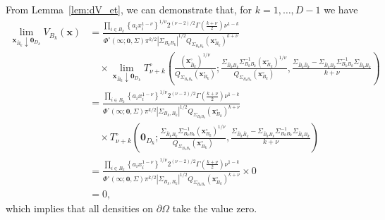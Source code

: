 \documentclass[lineno]{biometrika}
\begin{document}
From Lemma~\ref{lem:dV_et}, we can demonstrate that, for $k = 1, \ldots, D-1$ we have 
%
\begin{align*}
\lim_{\bm x_{\bar{B}_k} \downarrow \bm 0_{D_k}} V_{B_k}(\bm x) 
&= \frac{\prod_{i\in B_k} \left\{a_i x_i^{1-\nu} \right\}^{1/\nu} 2^{(\nu-2)/2} \Gamma \left(\frac{k+\nu}{2}\right) \nu^{1-k}}{\Phi^\circ(\bm \infty;\bm 0, \Sigma) \pi^{k/2}|\Sigma_{B_kB_k}|^{1/2}Q_{\Sigma_{B_k B_k}}\left(\bm x_{B_k}^\circ\right)^{k+\nu}} \\
&\quad \times \lim_{\bm x_{\bar{B}_k} \downarrow \bm 0_{D_k}}
T^\circ_{\nu+k}\left(\frac{\left(\bm x_{\bar{B}_k}^\circ\right)^{1/\nu}}{Q_{\Sigma_{B_k B_k}}\left(\bm x_{B_k}^\circ\right)};\frac{\Sigma_{\bar{B}_k B_k}\Sigma_{B_k B_k}^{-1}\left(\bm x_{B_k}^\circ\right)^{1/\nu}}{Q_{\Sigma_{B_k B_k}}\left(\bm x_{B_k}^\circ\right)},\frac{\Sigma_{\bar{B}_k \bar{B}_k}-\Sigma_{\bar{B}_k B_k}\Sigma_{B_k B_k}^{-1}\Sigma_{\bar{B}_k B_k}}{k+\nu}\right) \\
&= \frac{\prod_{i\in B_k} \left\{a_i x_i^{1-\nu} \right\}^{1/\nu} 2^{(\nu-2)/2} \Gamma \left(\frac{k+\nu}{2}\right) \nu^{1-k}}{\Phi^\circ(\bm \infty;\bm 0, \Sigma) \pi^{k/2}|\Sigma_{B_k,B_k}|^{1/2}Q_{\Sigma_{B_k B_k}}\left(\bm x_{B_k}^\circ\right)^{k+\nu}} \\
&\quad \times T^\circ_{\nu+k}\left(\bm 0_{D_k};\frac{\Sigma_{\bar{B}_k B_k}\Sigma_{B_k B_k}^{-1}\left(\bm x_{B_k}^\circ\right)^{1/\nu}}{Q_{\Sigma_{B_k B_k}}\left(\bm x_{B_k}^\circ\right)},\frac{\Sigma_{\bar{B}_k \bar{B}_k}-\Sigma_{\bar{B}_k B_k}\Sigma_{B_k B_k}^{-1}\Sigma_{\bar{B}_k B_k}}{k+\nu}\right) \\
&= \frac{\prod_{i\in B_k} \left\{a_i x_i^{1-\nu} \right\}^{1/\nu} 2^{(\nu-2)/2} \Gamma \left(\frac{k+\nu}{2}\right) \nu^{1-k}}{\Phi^\circ(\bm \infty;\bm 0, \Sigma) \pi^{k/2}|\Sigma_{B_k,B_k}|^{1/2}Q_{\Sigma_{B_k B_k}}\left(\bm x_{B_k}^\circ\right)^{k+\nu}} \times 0 \\
&= 0,
\end{align*}
%
which implies that all densities on $\partial\Omega$ take the value zero. 
\end{document}
